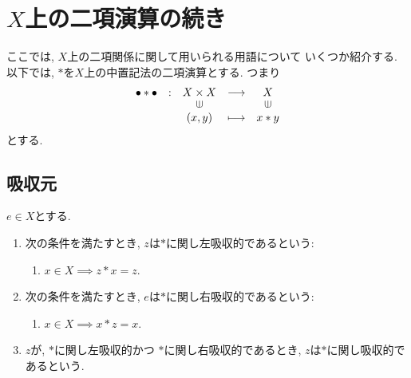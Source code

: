 \section{$X$上の二項演算の続き}
ここでは, $X$上の二項関係に関して用いられる用語について
いくつか紹介する.
以下では,
$\ast$を$X$上の中置記法の二項演算とする.
つまり
\begin{align*}
  \shazo{\bullet\ast\bullet}
        {X\times X}{X}
        {(x,y)}{x\ast y}
\end{align*}
とする.

\subsection{吸収元}
\begin{definition}
  $e\in X$とする.
  \begin{enumerate}
  \item
    次の条件を満たすとき,
    $z$は$\ast$に関し左吸収的であるという:
    \begin{enumerate}
    \item $x\in X\implies z\ast x=z$.
    \end{enumerate}
  \item
    次の条件を満たすとき,
    $e$は$\ast$に関し右吸収的であるという:
    \begin{enumerate}
    \item $x\in X\implies x\ast z=x$.
    \end{enumerate}
  \item
    $z$が,
    $\ast$に関し左吸収的かつ
    $\ast$に関し右吸収的であるとき,
    $z$は$\ast$に関し吸収的であるという.
  \end{enumerate}
\end{definition}

